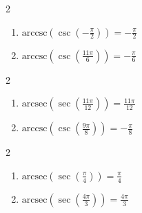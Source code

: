 \documentclass{ximera}
\begin{document}
\begin{multicols}{2}

\begin{enumerate}

\setcounter{enumi}{\value{HW}}

\item  $\text{arccsc}\left(\csc\left(-\frac{\pi}{2} \right) \right) = -\frac{\pi}{2}$ 
\item  $\text{arccsc}\left(\csc\left(\frac{11\pi}{6}\right) \right) = -\frac{\pi}{6}$

\setcounter{HW}{\value{enumi}}

\end{enumerate}

\end{multicols}

\begin{multicols}{2}

\begin{enumerate}

\setcounter{enumi}{\value{HW}}

\item  $\text{arcsec}\left(\sec\left(\frac{11\pi}{12}\right) \right) = \frac{11\pi}{12}$
\item  $\text{arccsc}\left(\csc\left(\frac{9\pi}{8}\right) \right) = -\frac{\pi}{8}$ 

\setcounter{HW}{\value{enumi}}

\end{enumerate}

\end{multicols}



\begin{multicols}{2}

\begin{enumerate}

\setcounter{enumi}{\value{HW}}

\item  $\text{arcsec}\left(\sec\left(\frac{\pi}{4}\right) \right) = \frac{\pi}{4}$ 
\item  $\text{arcsec}\left(\sec\left(\frac{4\pi}{3}\right) \right) = \frac{4\pi}{3}$

\setcounter{HW}{\value{enumi}}

\end{enumerate}

\end{multicols}
\end{document}
